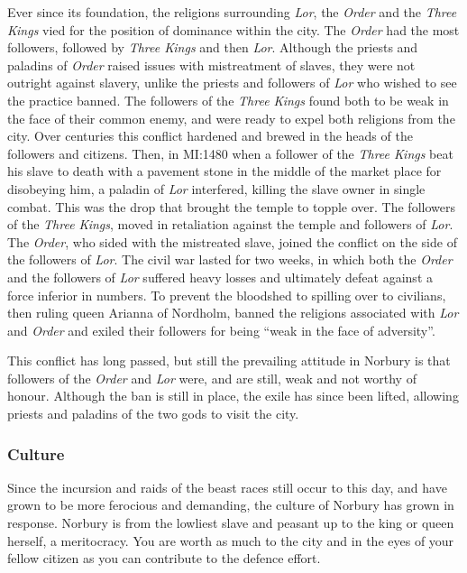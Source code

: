 Ever since its foundation, the religions surrounding \emph{Lor}, the
\emph{Order} and the \emph{Three Kings} vied for the position of dominance
within the city. The \emph{Order} had the most followers, followed by
\emph{Three Kings} and then \emph{Lor}. Although the priests and paladins of
\emph{Order} raised issues with mistreatment of slaves, they were not outright
against slavery, unlike the priests and followers of \emph{Lor} who wished
to see the practice banned. The followers of the \emph{Three Kings} found both
to be weak in the face of their common enemy, and were ready to expel both
religions from the city. Over centuries this conflict hardened and brewed in
the heads of the followers and citizens. Then, in MI:1480 when a follower of
the \emph{Three Kings} beat his slave to death with a pavement stone in the
middle of the market place for disobeying him, a paladin of \emph{Lor}
interfered, killing the slave owner in single combat. This was the drop that
brought the temple to topple over. The followers of the \emph{Three Kings},
moved in retaliation against the temple and followers of \emph{Lor}. The
\emph{Order}, who sided with the mistreated slave, joined the conflict on the
side of the followers of \emph{Lor}. The civil war lasted for two weeks, in
which both the \emph{Order} and the followers of \emph{Lor} suffered heavy
losses and ultimately defeat against a force inferior in numbers. To prevent
the bloodshed to spilling over to civilians, then ruling queen Arianna of
Nordholm, banned the religions associated with \emph{Lor} and \emph{Order} and
exiled their followers for being ``weak in the face of adversity''.

This conflict has long passed, but still the prevailing attitude in Norbury is
that followers of the \emph{Order} and \emph{Lor} were, and are still, weak
and not worthy of honour. Although the ban is still in place, the exile has
since been lifted, allowing priests and paladins of the two gods to visit the
city.

\subsubsection*{Culture}

Since the incursion and raids of the beast races still occur to this day,
and have grown to be more ferocious and demanding, the culture of Norbury
has grown in response. Norbury is from the lowliest slave and peasant up
to the king or queen herself, a meritocracy. You are worth as much to the
city and in the eyes of your fellow citizen as you can contribute to the
defence effort.

